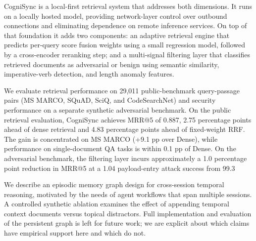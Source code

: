 \documentclass[sigconf]{acmart}
\begin{document}
CogniSync is a local-first retrieval system that addresses both dimensions.
It runs on a locally hosted model, providing network-layer control over outbound
connections and eliminating dependence on remote inference services. On top of
that foundation it adds two components: an adaptive retrieval engine that
predicts per-query score fusion weights using a small regression model, followed
by a cross-encoder reranking step; and a multi-signal filtering layer that
classifies retrieved documents as adversarial or benign using semantic
similarity, imperative-verb detection, and length anomaly features.

We evaluate retrieval performance on 29,011 public-benchmark query-passage pairs
(MS MARCO, SQuAD, SciQ, and CodeSearchNet) and security performance on a
separate synthetic adversarial benchmark. On the public retrieval evaluation,
CogniSync achieves MRR@5 of 0.887, 2.75 percentage points ahead of dense
retrieval and 4.83 percentage points ahead of fixed-weight RRF. The gain is
concentrated on MS MARCO (+9.1 pp over Dense), while performance on
single-document QA tasks is within 0.1 pp of Dense. On the adversarial
benchmark, the filtering layer incurs approximately a 1.0 percentage point
reduction in MRR@5 at a 1.04%
payload-entry attack success from 99.3%

We describe an episodic memory graph design for cross-session temporal
reasoning, motivated by the needs of agent workflows that span multiple
sessions. A controlled synthetic ablation examines the effect of appending
temporal context documents versus topical distractors. Full implementation and
evaluation of the persistent graph is left for future work; we are explicit
about which claims have empirical support here and which do not.
\end{document}
